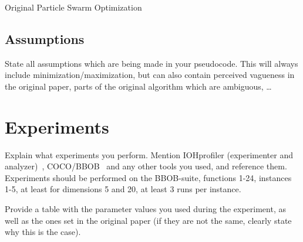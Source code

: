 \documentclass[runningheads]{llncs}
\begin{document}
\vspace{-4mm} 
\begin{algorithm}[!ht]
\begin{algorithmic}[1]
		  
	\EndFor
	
			\EndIf   
				 
			\EndIf  
			   
		\EndFor
	\EndWhile
 \end{algorithmic}
\caption{Original Particle Swarm Optimization}
\label{Alg:PSO}
\end{algorithm}
\vspace{-2mm}

\subsection{Assumptions}
State all assumptions which are being made in your pseudocode. This will always include minimization/maximization, but can also contain perceived vagueness in the original paper, parts of the original algorithm which are ambiguous, \dots

\section{Experiments}
Explain what experiments you perform. Mention IOHprofiler (experimenter and analyzer)~\cite{IOHprofiler}, COCO/BBOB~\cite{COCO} and any other tools you used, and reference them. 
Experiments should be performed on the BBOB-suite, functions 1-24, instances 1-5, at least for dimensions 5 and 20, at least 3 runs per instance.

Provide a table with the parameter values you used during the experiment, as well as the ones set in the original paper (if they are not the same, clearly state why this is the case). 
\end{document}
